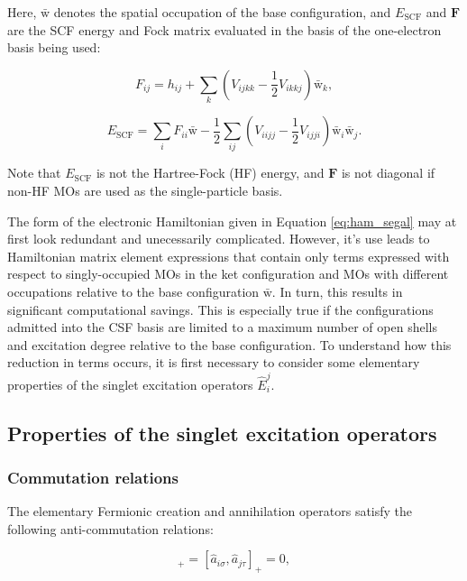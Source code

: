 \documentclass[12pt,a4paper]{report}
\begin{document}
\noindent
Here, $\bar{\text{w}}$ denotes the spatial occupation of the base
configuration, and $E_{\text{SCF}}$ and $\boldsymbol{F}$ are the SCF
energy and Fock matrix evaluated in the basis of the one-electron
basis being used:

\begin{equation}
  F_{ij} = h_{ij} + \sum_{k} \left(V_{ijkk} - \frac{1}{2} V_{ikkj}
  \right) \bar{\text{w}}_{k},
\end{equation}

\begin{equation}
  E_{\text{SCF}} = \sum_{i} F_{ii} \bar{\text{w}} - \frac{1}{2}
  \sum_{ij} \left( V_{iijj} - \frac{1}{2} V_{ijji} \right)
  \bar{\text{w}}_{i} \bar{\text{w}}_{j}.
\end{equation}

\noindent
Note that $E_{\text{SCF}}$ is not the Hartree-Fock (HF) energy, and
$\boldsymbol{F}$ is not diagonal if non-HF MOs are used as the
single-particle basis.

The form of the electronic Hamiltonian given in Equation
\ref{eq:ham_segal} may at first look redundant and unecessarily
complicated. However, it's use leads to Hamiltonian matrix element
expressions that contain only terms expressed with respect to
singly-occupied MOs in the ket configuration and MOs with different
occupations relative to the base configuration $\bar{\text{w}}$. In
turn, this results in significant computational savings. This is
especially true if the configurations admitted into the CSF basis are
limited to a maximum number of open shells and excitation degree
relative to the base configuration. To understand how this reduction
in terms occurs, it is first necessary to consider some elementary
properties of the singlet excitation operators $\hat{E}_{i}^{j}$.

\subsection{Properties of the singlet excitation operators}
\subsubsection{Commutation relations}
The elementary Fermionic creation and annihilation operators satisfy
the following anti-commutation relations:

\begin{equation}
  [ \hat{a}_{i\sigma}^{\dagger}, \hat{a}_{j\tau}^{\dagger} ]_{+} = [
    \hat{a}_{i\sigma}, \hat{a}_{j\tau} ]_{+} = 0,
\end{equation}
\end{document}
